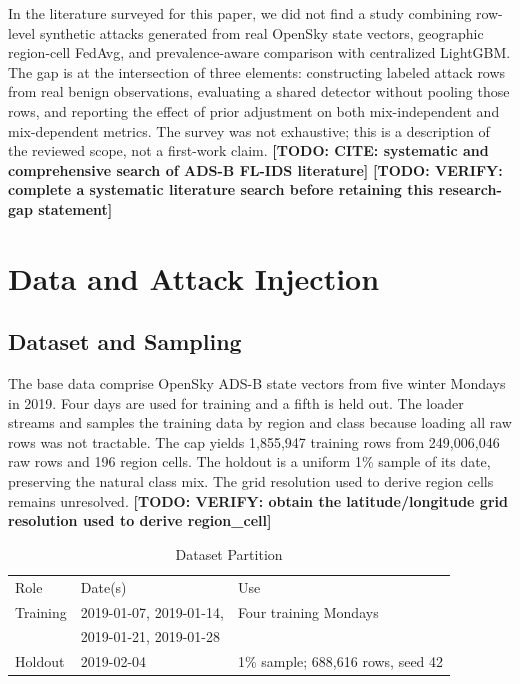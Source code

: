 \documentclass[conference]{IEEEtran}
\newcommand{\todo}[1]{\textbf{[TODO: #1]}}
\begin{document}
In the literature surveyed for this paper, we did not find a study combining row-level synthetic attacks generated from real OpenSky state vectors, geographic region-cell FedAvg, and prevalence-aware comparison with centralized LightGBM. The gap is at the intersection of three elements: constructing labeled attack rows from real benign observations, evaluating a shared detector without pooling those rows, and reporting the effect of prior adjustment on both mix-independent and mix-dependent metrics. The survey was not exhaustive; this is a description of the reviewed scope, not a first-work claim. \todo{CITE: systematic and comprehensive search of ADS-B FL-IDS literature} \todo{VERIFY: complete a systematic literature search before retaining this research-gap statement}



\section{Data and Attack Injection}

\subsection{Dataset and Sampling}

The base data comprise OpenSky ADS-B state vectors from five winter Mondays in 2019. Four days are used for training and a fifth is held out. The loader streams and samples the training data by region and class because loading all raw rows was not tractable. The cap yields 1,855,947 training rows from 249,006,046 raw rows and 196 region cells. The holdout is a uniform 1\% sample of its date, preserving the natural class mix. The grid resolution used to derive region cells remains unresolved. \todo{VERIFY: obtain the latitude/longitude grid resolution used to derive region\_cell}



\begin{table}[t]\caption{Dataset Partition}\label{tab:data}\centering\footnotesize

\begin{tabularx}{\columnwidth}{lXX}\toprule Role & Date(s) & Use \\

Training & 2019-01-07, 2019-01-14, & Four training Mondays \\

 & 2019-01-21, 2019-01-28 & \\

Holdout & 2019-02-04 & 1\% sample; 688,616 rows, seed 42 \\

\bottomrule\end{tabularx}\end{table}
\end{document}
